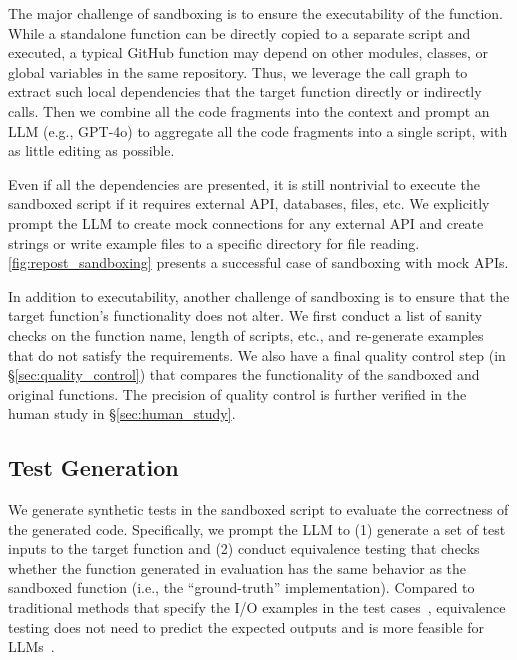 The major challenge of sandboxing is to ensure the executability of the function.
While a standalone function can be directly copied to a separate script and executed, a typical GitHub function may depend on other modules, classes, or global variables in the same repository.
Thus, we leverage the call graph to extract such local dependencies that the target function directly or indirectly calls.
Then we combine all the code fragments into the context and prompt an LLM (e.g., GPT-4o) to aggregate all the code fragments into a single script, with as little editing as possible.


Even if all the dependencies are presented, it is still nontrivial to execute the sandboxed script if it requires external API, databases, files, etc. 
We explicitly prompt the LLM to create mock connections for any external API and create strings or write example files to a specific directory for file reading.
\autoref{fig:repost_sandboxing} presents a successful case of sandboxing with mock APIs.


In addition to executability, another challenge of sandboxing is to ensure that the target function's functionality does not alter.
We first conduct a list of sanity checks on the function name, length of scripts, etc., and re-generate examples that do not satisfy the requirements.
We also have a final quality control step (in \S\ref{sec:quality_control}) that compares the functionality of the sandboxed and original functions.
The precision of quality control is further verified in the human study in \S\ref{sec:human_study}.


\subsection{Test Generation}
\label{sec:test_generation}

We generate synthetic tests in the sandboxed script to evaluate the correctness of the generated code.
Specifically, we prompt the LLM to (1) generate a set of test inputs to the target function and (2) conduct equivalence testing that checks whether the function generated in evaluation has the same behavior as the sandboxed function (i.e., the ``ground-truth'' implementation).
Compared to traditional methods that specify the I/O examples in the test cases~\citep{codex}, equivalence testing does not need to predict the expected outputs and is more feasible for LLMs~\citep{R2E}.


